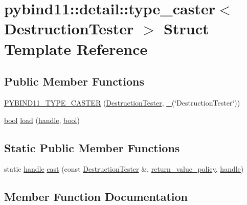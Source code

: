 \hypertarget{structpybind11_1_1detail_1_1type__caster_3_01_destruction_tester_01_4}{}\section{pybind11\+::detail\+::type\+\_\+caster$<$ Destruction\+Tester $>$ Struct Template Reference}
\label{structpybind11_1_1detail_1_1type__caster_3_01_destruction_tester_01_4}
\subsection*{Public Member Functions}
\begin{DoxyCompactItemize}
\item 
\mbox{\hyperlink{structpybind11_1_1detail_1_1type__caster_3_01_destruction_tester_01_4_acdd082fc19a5b7231d25e79ada337017}{P\+Y\+B\+I\+N\+D11\+\_\+\+T\+Y\+P\+E\+\_\+\+C\+A\+S\+T\+ER}} (\mbox{\hyperlink{class_destruction_tester}{Destruction\+Tester}}, \mbox{\hyperlink{descr_8h_af114703e20c6527e87163eb2798f74b8}{\+\_\+}}(\char`\"{}Destruction\+Tester\char`\"{}))
\item 
\mbox{\hyperlink{asdl_8h_af6a258d8f3ee5206d682d799316314b1}{bool}} \mbox{\hyperlink{structpybind11_1_1detail_1_1type__caster_3_01_destruction_tester_01_4_af3270287ab2f7311379ecab27d311ab9}{load}} (\mbox{\hyperlink{classhandle}{handle}}, \mbox{\hyperlink{asdl_8h_af6a258d8f3ee5206d682d799316314b1}{bool}})
\end{DoxyCompactItemize}
\subsection*{Static Public Member Functions}
\begin{DoxyCompactItemize}
\item 
static \mbox{\hyperlink{classhandle}{handle}} \mbox{\hyperlink{structpybind11_1_1detail_1_1type__caster_3_01_destruction_tester_01_4_a005e99aa6cf0a350f3f76260de2aa950}{cast}} (const \mbox{\hyperlink{class_destruction_tester}{Destruction\+Tester}} \&, \mbox{\hyperlink{detail_2common_8h_adde72ab1fb0dd4b48a5232c349a53841}{return\+\_\+value\+\_\+policy}}, \mbox{\hyperlink{classhandle}{handle}})
\end{DoxyCompactItemize}


\subsection{Member Function Documentation}
\mbox{\label{structpybind11_1_1detail_1_1type__caster_3_01_destruction_tester_01_4_a005e99aa6cf0a350f3f76260de2aa950}} 
